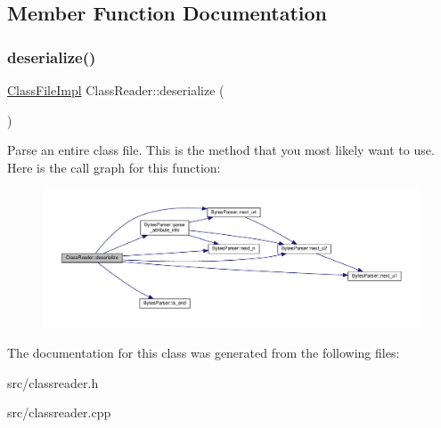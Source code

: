 \subsection{Member Function Documentation}
\mbox{\label{classClassReader_a001cc48324c31430559b43976d731e8a}} 
\subsubsection{\texorpdfstring{deserialize()}{deserialize()}}
{\footnotesize\ttfamily \hyperlink{classClassFileImpl}{Class\+File\+Impl} Class\+Reader\+::deserialize (\begin{DoxyParamCaption}{ }\end{DoxyParamCaption})}

Parse an entire class file. This is the method that you most likely want to use. Here is the call graph for this function\+:\nopagebreak
\begin{figure}[H]
\begin{center}
\leavevmode
\includegraphics[width=350pt]{classClassReader_a001cc48324c31430559b43976d731e8a_cgraph}
\end{center}
\end{figure}


The documentation for this class was generated from the following files\+:\begin{DoxyCompactItemize}
\item 
src/classreader.\+h\item 
src/classreader.\+cpp\end{DoxyCompactItemize}
